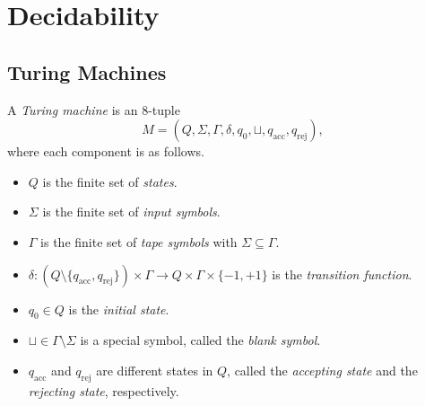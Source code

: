\chapter{Decidability}
\section{Turing Machines}
\begin{definition}
  A \emph{Turing machine} is an 8-tuple
  \begin{equation*}
    M = (Q, \Sigma, \Gamma, \delta, q_0, \sqcup, q_\text{acc}, q_\text{rej}),
  \end{equation*}
  where each component is as follows.
  \begin{itemize}
    \item $Q$ is the finite set of \emph{states}.
    \item $\Sigma$ is the finite set of \emph{input symbols}.
    \item $\Gamma$ is the finite set of \emph{tape symbols} with
    $\Sigma \subseteq \Gamma$.
    \item $\delta : (Q \setminus \{q_\text{acc}, q_\text{rej}\}) \times \Gamma
    \to Q \times \Gamma \times \{-1, +1\}$ is the \emph{transition function}.
    \item $q_0 \in Q$ is the \emph{initial state}.
    \item $\sqcup \in \Gamma \setminus \Sigma$ is a special symbol, called the
    \emph{blank symbol}.
    \item $q_\text{acc}$ and $q_\text{rej}$ are different states in $Q$,
    called the \emph{accepting state} and the \emph{rejecting state},
    respectively.
  \end{itemize}
\end{definition}

